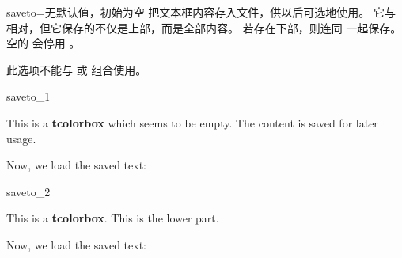 \clearpage
\begin{docTcbKey}[][doc new=2015-05-04]{saveto}{=}{无默认值，初始为空}
  把文本框内容存入文件，供以后可选地使用。
  它与  相对，但它保存的不仅是上部，而是全部内容。
  若存在下部，则连同  一起保存。
  空的  会停用 。
  \begin{marker}
  此选项不能与  或
   组合使用。
  \end{marker}

\begin{exdispExample}{saveto_1}
\begin{tcolorbox}[invisible,saveto=\jobname_mysave1.tex,colback=white]
This is a \textbf{tcolorbox} which seems to be empty.
The content is saved for later usage.
\end{tcolorbox}

Now, we load the saved text:\\

\end{exdispExample}

\begin{exdispExample}{saveto_2}
\begin{tcolorbox}[saveto=\jobname_mysave2.tex]
This is a \textbf{tcolorbox}.
\tcblower
This is the lower part.
\end{tcolorbox}

Now, we load the saved text:
\begin{tcolorbox}[colframe=red,colback=red!10,
  coltitle=black,colbacktitle=red!20,sidebyside,
  title=Here we see the saved content including the lower part]

\end{tcolorbox}
\end{exdispExample}
\end{docTcbKey}



\clearpage
